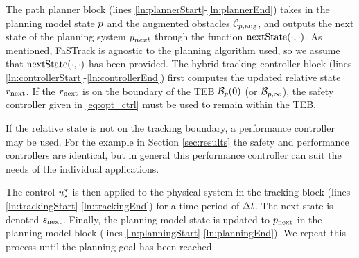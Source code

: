 The path planner block (lines \ref{ln:plannerStart}-\ref{ln:plannerEnd}) takes in the planning model state $p$ and the augmented obstacles $\mathcal C_{p,\text{aug}}$, and outputs the next state of the planning system $p_{next}$ through the function $\text{nextState}(\cdot, \cdot)$.
As mentioned, FaSTrack is agnostic to the planning algorithm used, so we assume that $\text{nextState}(\cdot, \cdot)$ has been provided.
The hybrid tracking controller block (lines \ref{ln:controllerStart}-\ref{ln:controllerEnd}) first computes the updated relative state $r_\text{next}$. 
If the $r_\text{next}$ is on the boundary of the TEB $\mathcal B_p(0)$ (or $\mathcal B_{p, \infty}$), the safety controller given in \eqref{eq:opt_ctrl} must be used to remain within the TEB. 

If the relative state is not on the tracking boundary, a performance controller may be used. For the example in Section \ref{sec:results} the safety and performance controllers are identical, but in general this performance controller can suit the needs of the individual applications.

The control $u_s^*$ is then applied to the physical system in the tracking block (lines \ref{ln:trackingStart}-\ref{ln:trackingEnd}) for a time period of $\Delta t$. 
The next state is denoted $s_\text{next}$. 
Finally, the planning model state is updated to $p_\text{next}$ in the planning model block (lines \ref{ln:planningStart}-\ref{ln:planningEnd}). 
We repeat this process until the planning goal has been reached.